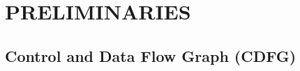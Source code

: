 \documentclass[conference]{IEEEtran}
\begin{document}

\vspace{-0.1cm} 
\section{PRELIMINARIES}
\vspace{-0.1cm} 

\subsection{Control and Data Flow Graph (CDFG)}
\vspace{-0.1cm} 




\end{document}
